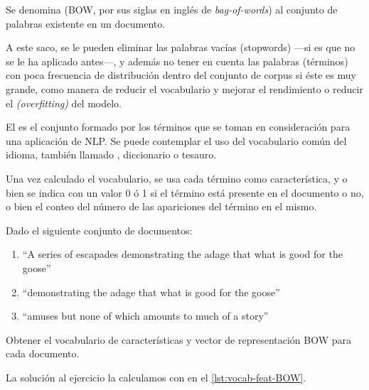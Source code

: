 \begin{definition}
Se denomina  (BOW, por sus siglas en inglés de \emph{bag-of-words}) al conjunto de palabras existente en un documento.
\end{definition}

A este saco, se le pueden eliminar las palabras vacías (stopwords) ---si es que no se le ha aplicado antes---, y además no tener en cuenta las palabras (términos) con poca frecuencia de distribución dentro del conjunto de corpus si éste es muy grande, como manera de reducir el vocabulario y mejorar el rendimiento o reducir el  \emph{(overfitting)} del modelo.

\begin{definition}[vocabulario]
El  es el conjunto formado por los términos que se toman en consideración para una aplicación de NLP. Se puede contemplar el uso del vocabulario común del idioma, también llamado , diccionario o tesauro.
\end{definition}

Una vez calculado el vocabulario, se usa cada término como característica, y o bien se indica con un valor 0 ó 1 si el término está presente en el documento o no, o bien el conteo del número de las apariciones del término en el mismo.

\begin{example}\label{exa:ml-bow}
Dado el siguiente conjunto de documentos:
\begin{enumerate}
\item ``A series of escapades demonstrating the adage that what is good for the goose''
\item ``demonstrating the adage that what is good for the goose''
\item ``amuses but none of which amounts to much of a story''
\end{enumerate}
Obtener el vocabulario de características y vector de representación BOW para cada documento.
\end{example}

La solución al ejercicio la calculamos con en el \autoref{lst:vocab-feat-BOW}.

